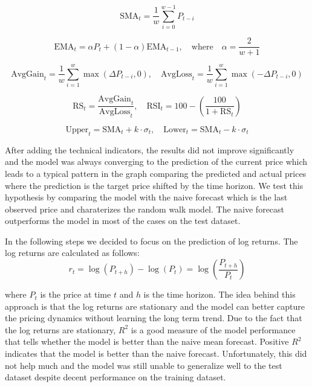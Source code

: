 \begin{equation}\label{eq:sma}
    \text{SMA}_t = \frac{1}{w} \sum_{i=0}^{w-1} P_{t-i}
\end{equation}

\begin{equation}\label{eq:ema}
    \text{EMA}_t = \alpha P_t + (1 - \alpha) \text{EMA}_{t-1}, \quad \text{where} \quad \alpha = \frac{2}{w + 1}
\end{equation}

\begin{equation}\label{eq:rsi_avg}
    \text{AvgGain}_t = \frac{1}{w} \sum_{i=1}^{w} \max(\Delta P_{t-i}, 0), \quad
    \text{AvgLoss}_t = \frac{1}{w} \sum_{i=1}^{w} \max(-\Delta P_{t-i}, 0)
\end{equation}

\begin{equation}\label{eq:rsi}
    \text{RS}_t = \frac{\text{AvgGain}_t}{\text{AvgLoss}_t}, \quad
    \text{RSI}_t = 100 - \left( \frac{100}{1 + \text{RS}_t} \right)
\end{equation}

\begin{equation}\label{eq:bbands}
    \text{Upper}_t = \text{SMA}_t + k \cdot \sigma_t, \quad
    \text{Lower}_t = \text{SMA}_t - k \cdot \sigma_t
\end{equation}

After adding the technical indicators, the results
did not improve significantly and the model 
was always converging to the prediction of the current price
which leads to a typical pattern in the 
graph comparing the predicted and actual prices where the prediction
is the target price shifted by the time horizon.
We test this hypothesis by comparing
the model with the naive forecast which is the last
observed price and charaterizes
the random walk model. The naive forecast outperforms 
the model in most of the cases on the test dataset. 


In the following steps we decided to focus on the prediction
of log returns. The log returns are calculated as follows:
\begin{equation}\label{eq:log_returns}
    r_t = \log(P_{t+h}) - \log(P_t) = \log\left(\frac{P_{t+h}}{P_t}\right)
\end{equation}

where $P_t$ is the price at time $t$ and $h$ is the time horizon.
The idea behind this approach is that the log returns are stationary
and the model can better capture
the pricing dynamics without learning the long term trend.
Due to the fact that the log returns are stationary, 
$R^2$ is a good measure of the model performance that
tells whether the model is better than the naive mean forecast.
Positive $R^2$ indicates that the model is better than the naive forecast.
Unfortunately, this did not help much and the model was still
unable to generalize well to the test dataset despite
decent performance on the training dataset.


